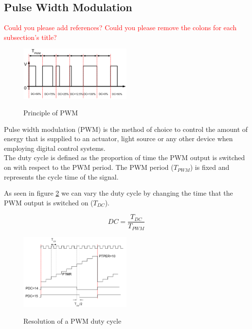 \subsection{Pulse Width Modulation} 

\textcolor{red}{Could you please add references?}
\textcolor{red}{Could you please remove the colons for each subsection's title?}


\begin{figure}
    \caption{Principle of PWM \cite{alex}}
        \centering
            \includegraphics[width=0.5\textwidth]{figures/software/pwm_demo.png}
            \label{fig:pwm_demo}
\end{figure}

Pulse width modulation (PWM) is the method of choice to control the amount of energy that is supplied to an actuator, light source or any other device when employing digital control systems.\\
The duty cycle is defined as the proportion of time the PWM output is switched on with respect to the PWM period.
The PWM period ($T_{PWM}$) is fixed and represents the cycle time of the signal.

As seen in figure \ref{fig:pwm_demo} we can vary the duty cycle by changing the time that the PWM output is switched on ($T_{DC}$).

$$DC = \frac{T_{DC}}{T_{PWM}}$$

\begin{figure}
    \caption{Resolution of a PWM duty cycle \cite{alex}}
        \centering
            \includegraphics[width=0.5\textwidth]{figures/software/pwm_choice.png}
            \label{fig:pwm_demo}
\end{figure}

